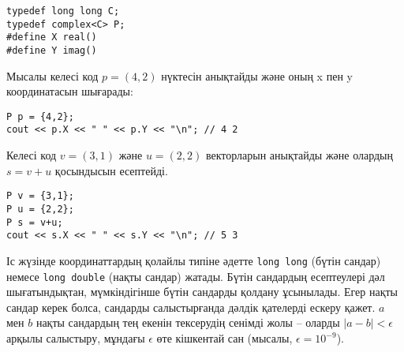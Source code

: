 
\begin{lstlisting}
typedef long long C;
typedef complex<C> P;
#define X real()
#define Y imag()
\end{lstlisting}

Мысалы келесі код $p=(4,2)$ нүктесін анықтайды және оның 
x пен y координатасын шығарады:


\begin{lstlisting}
P p = {4,2};
cout << p.X << " " << p.Y << "\n"; // 4 2
\end{lstlisting}

Келесі код $v=(3,1)$ және $u=(2,2)$ векторларын анықтайды
және олардың  $s=v+u$ қосындысын есептейді. 


\begin{lstlisting}
P v = {3,1};
P u = {2,2};
P s = v+u;
cout << s.X << " " << s.Y << "\n"; // 5 3
\end{lstlisting}

Іс жүзінде координаттардың қолайлы типіне әдетте 
\texttt{long long} (бүтін сандар) немесе 
\texttt{long double} (нақты сандар) жатады. Бүтін сандардың есептеулері дәл шығатындықтан, мүмкіндігінше бүтін сандарды қолдану ұсынылады.  
Егер нақты сандар керек болса, сандарды салыстырғанда
дәлдік қателерді ескеру қажет.  
$a$ мен $b$ нақты сандардың тең екенін тексерудің сенімді жолы -- оларды $|a-b|<\epsilon$ арқылы салыстыру, 
мұндағы $\epsilon$ өте кішкентай сан (мысалы, $\epsilon=10^{-9}$). 



